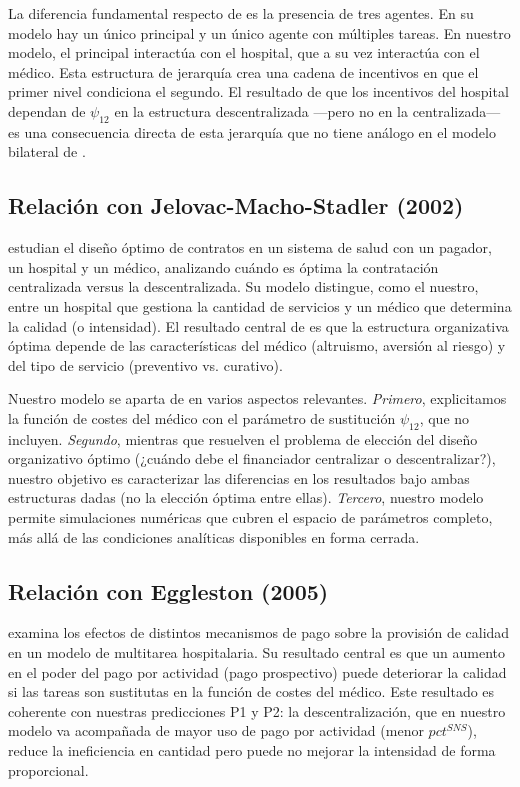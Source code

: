 \documentclass[12pt, a4paper, twoside, openright]{book}
\theoremstyle{plain}
\theoremstyle{definition}
\theoremstyle{remark}
\begin{document}
La diferencia fundamental respecto de \citet{holmstrom1991} es la presencia de tres agentes. En su modelo hay un único principal y un único agente con múltiples tareas. En nuestro modelo, el principal interactúa con el hospital, que a su vez interactúa con el médico. Esta estructura de jerarquía crea una cadena de incentivos en que el primer nivel condiciona el segundo. El resultado de que los incentivos del hospital dependan de $\psi_{12}$ en la estructura descentralizada ---pero no en la centralizada--- es una consecuencia directa de esta jerarquía que no tiene análogo en el modelo bilateral de \citet{holmstrom1991}.

\subsection{Relación con Jelovac-Macho-Stadler (2002)}

\citet{jelovac2002} estudian el diseño óptimo de contratos en un sistema de salud con un pagador, un hospital y un médico, analizando cuándo es óptima la contratación centralizada versus la descentralizada. Su modelo distingue, como el nuestro, entre un hospital que gestiona la cantidad de servicios y un médico que determina la calidad (o intensidad). El resultado central de \citet{jelovac2002} es que la estructura organizativa óptima depende de las características del médico (altruismo, aversión al riesgo) y del tipo de servicio (preventivo vs. curativo).

Nuestro modelo se aparta de \citet{jelovac2002} en varios aspectos relevantes. \textit{Primero}, explicitamos la función de costes del médico con el parámetro de sustitución $\psi_{12}$, que \citet{jelovac2002} no incluyen. \textit{Segundo}, mientras que \citet{jelovac2002} resuelven el problema de elección del diseño organizativo óptimo (¿cuándo debe el financiador centralizar o descentralizar?), nuestro objetivo es caracterizar las diferencias en los resultados bajo ambas estructuras dadas (no la elección óptima entre ellas). \textit{Tercero}, nuestro modelo permite simulaciones numéricas que cubren el espacio de parámetros completo, más allá de las condiciones analíticas disponibles en forma cerrada.

\subsection{Relación con Eggleston (2005)}

\citet{eggleston2005} examina los efectos de distintos mecanismos de pago sobre la provisión de calidad en un modelo de multitarea hospitalaria. Su resultado central es que un aumento en el poder del pago por actividad (pago prospectivo) puede deteriorar la calidad si las tareas son sustitutas en la función de costes del médico. Este resultado es coherente con nuestras predicciones P1 y P2: la descentralización, que en nuestro modelo va acompañada de mayor uso de pago por actividad (menor $pct^{SNS}$), reduce la ineficiencia en cantidad pero puede no mejorar la intensidad de forma proporcional.
\end{document}
